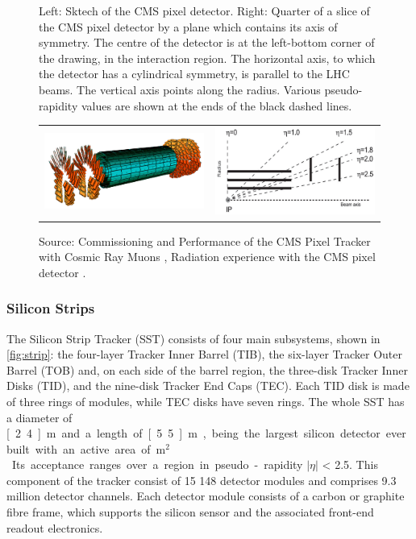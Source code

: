 \begin{figure}[H]
  \caption{Left: Sktech of the CMS pixel detector. Right: Quarter of a slice of the CMS pixel detector by a plane which contains its axis of symmetry. The centre of the detector is at the left-bottom corner of the drawing, in the interaction region. The horizontal axis, to which the detector has a cylindrical symmetry, is parallel to the LHC beams. The vertical axis points along the radius. Various pseudo-rapidity values are shown at the ends of the black dashed lines. \label{fig:pixel}}
\begin{tabular}{cc}
\includegraphics[width=8cm]{CMS_chapter_plots/pixel2} &
\includegraphics[width=8cm]{CMS_chapter_plots/pixel3}
\end{tabular}
  \caption*{Source: Commissioning and Performance of the CMS Pixel Tracker with Cosmic Ray Muons \cite{Chatrchyan:2009aa}, Radiation experience with the CMS pixel detector \cite{Veszpremi:2014exa}. }
\end{figure}

\subsubsection{Silicon Strips} \label{strip}

The Silicon Strip Tracker (SST) consists of four main subsystems, shown in \cref{fig:strip}: the four-layer Tracker Inner Barrel (TIB), the six-layer Tracker Outer Barrel (TOB) and, on each side of the barrel region, the three-disk Tracker Inner Disks (TID), and the nine-disk Tracker End Caps (TEC). Each TID disk is made of three rings of modules, while TEC disks have seven rings. The whole SST has a diameter of \unit[2.4]{m} and a length of \unit[5.5]{m}, being the largest silicon detector ever built with an active area of \unit[198]{m$^{2}$}. Its acceptance ranges over a region in pseudo-rapidity $\left| \eta\right|$ < 2.5. This component of the tracker consist of 15 148 detector modules and comprises 9.3 million detector channels. Each detector module consists of a carbon or graphite fibre frame, which supports the silicon sensor and the associated front-end readout electronics.
 
